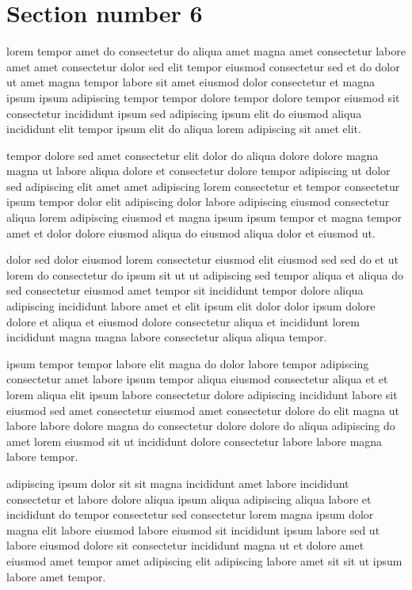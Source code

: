\documentclass{article}
\begin{document}
\section{Section number 6}\label{sec:6}
lorem tempor amet do consectetur do aliqua amet magna amet consectetur labore amet amet consectetur dolor sed elit tempor eiusmod consectetur sed et do dolor ut amet magna tempor labore sit amet eiusmod dolor consectetur et magna ipsum ipsum adipiscing tempor tempor dolore tempor dolore tempor eiusmod sit consectetur incididunt ipsum sed adipiscing ipsum elit do eiusmod aliqua incididunt elit tempor ipsum elit do aliqua lorem adipiscing sit amet elit.

tempor dolore sed amet consectetur elit dolor do aliqua dolore dolore magna magna ut labore aliqua dolore et consectetur dolore tempor adipiscing ut dolor sed adipiscing elit amet amet adipiscing lorem consectetur et tempor consectetur ipsum tempor dolor elit adipiscing dolor labore adipiscing eiusmod consectetur aliqua lorem adipiscing eiusmod et magna ipsum ipsum tempor et magna tempor amet et dolor dolore eiusmod aliqua do eiusmod aliqua dolor et eiusmod ut.

dolor sed dolor eiusmod lorem consectetur eiusmod elit eiusmod sed sed do et ut lorem do consectetur do ipsum sit ut ut adipiscing sed tempor aliqua et aliqua do sed consectetur eiusmod amet tempor sit incididunt tempor dolore aliqua adipiscing incididunt labore amet et elit ipsum elit dolor dolor ipsum dolore dolore et aliqua et eiusmod dolore consectetur aliqua et incididunt lorem incididunt magna magna labore consectetur aliqua aliqua tempor.

ipsum tempor tempor labore elit magna do dolor labore tempor adipiscing consectetur amet labore ipsum tempor aliqua eiusmod consectetur aliqua et et lorem aliqua elit ipsum labore consectetur dolore adipiscing incididunt labore sit eiusmod sed amet consectetur eiusmod amet consectetur dolore do elit magna ut labore labore dolore magna do consectetur dolore dolore do aliqua adipiscing do amet lorem eiusmod sit ut incididunt dolore consectetur labore labore magna labore tempor.

adipiscing ipsum dolor sit sit magna incididunt amet labore incididunt consectetur et labore dolore aliqua ipsum aliqua adipiscing aliqua labore et incididunt do tempor consectetur sed consectetur lorem magna ipsum dolor magna elit labore eiusmod labore eiusmod sit incididunt ipsum labore sed ut labore eiusmod dolore sit consectetur incididunt magna ut et dolore amet eiusmod amet tempor amet adipiscing elit adipiscing labore amet sit sit ut ipsum labore amet tempor.
\end{document}

